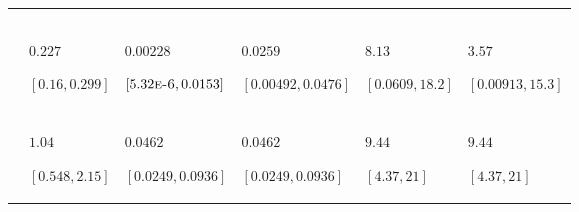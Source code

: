 \begin{table}
\centering
\begin{tabular}{>{\raggedleft\arraybackslash}m{1.2cm}>{\raggedright\arraybackslash}m{2.3cm}>{\raggedright\arraybackslash}m{2.3cm}>{\raggedright\arraybackslash}m{2.3cm}ll}
\toprule
\multicolumn{1}{c}{\cellcolor{blue!15!gray}{}} & \multicolumn{1}{c}{\cellcolor{blue!15!gray}{$L_{0}$}} & \multicolumn{2}{c}{\cellcolor{blue!15!gray}{$k$}} & \multicolumn{2}{c}{\cellcolor{blue!15!gray}{$L_{\infty}$}} \\
\cellcolor{blue!15!gray}{Estimate} & \cellcolor{blue!15!gray}{Both} & \cellcolor{blue!15!gray}{Female} & \cellcolor{blue!15!gray}{Male} & \cellcolor{blue!15!gray}{Female} & \cellcolor{blue!15!gray}{Male}\\
\midrule
\cellcolor{blue!5!white!90!black}{$\mu$} & \cellcolor{gray}{$21.4$\par $[21,21.8]$} & \cellcolor{gray}{$1.2$\par $[1.11,1.3]$} & \cellcolor{gray}{$1.16$\par $[1.07,1.26]$} & \cellcolor{gray}{$65.5$\par $[64,67]$} & \cellcolor{gray}{$62$\par $[60.3,63.9]$}\\
\cellcolor{blue!5!white!90!black}{$V_{\text{A}}$} & $0.227$\par $[0.16,0.299]$ & $0.00228$\par $[5.32\text{\textsc{e-6}},0.0153]$ & $0.0259$\par $[0.00492,0.0476]$ & $8.13$\par $[0.0609,18.2]$ & $3.57$\par $[0.00913,15.3]$\\
\cellcolor{blue!5!white!90!black}{$V_{\text{M}}$} & \cellcolor{gray}{$0.285$\par $[0.238,0.338]$} & \cellcolor{gray}{$0.00305$\par $[1.68\text{\textsc{e-5}},0.00916]$} & \cellcolor{gray}{$0.00305$\par $[1.68\text{\textsc{e-5}},0.00916]$} & \cellcolor{gray}{$2.05$\par $[0.00939,7.28]$} & \cellcolor{gray}{$2.05$\par $[0.00939,7.28]$}\\
\cellcolor{blue!5!white!90!black}{$V_{\text{Y}}$} & $1.04$\par $[0.548,2.15]$ & $0.0462$\par $[0.0249,0.0936]$ & $0.0462$\par $[0.0249,0.0936]$ & $9.44$\par $[4.37,21]$ & $9.44$\par $[4.37,21]$\\

\end{tabular}
\end{table}

